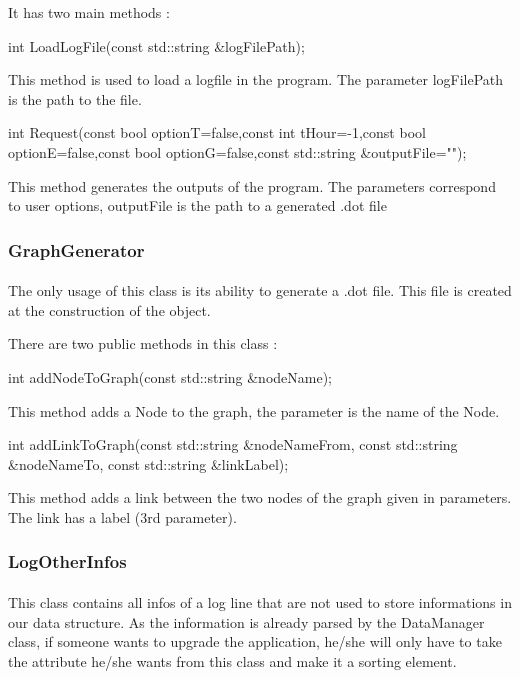 \documentclass[a4paper, 12pts]{article}
\begin{document}
It has two main methods :\newline

int LoadLogFile(const std::string \&logFilePath);

This method is used to load a logfile in the program. The parameter logFilePath is the path to the file.

int Request(const bool optionT=false,const int tHour=-1,const bool optionE=false,const bool optionG=false,const std::string \&outputFile="");

This method generates the outputs of the program. The parameters correspond to user options, outputFile is the path to a generated .dot file
\subsubsection{GraphGenerator}
\paragraph{}
The only usage of this class is its ability to generate a .dot file. This file is created at the construction of the object.

There are two public methods in this class :\newline

int addNodeToGraph(const std::string \&nodeName);

This method adds a Node to the graph, the parameter is the name of the Node.

int addLinkToGraph(const std::string \&nodeNameFrom, const std::string \&nodeNameTo, const std::string \&linkLabel);

This method adds a link between the two nodes of the graph given in parameters. The link has a label (3rd parameter).
\subsubsection{LogOtherInfos}
\paragraph{}
This class contains all infos of a log line that are not used to store informations in our data structure. As the information is already parsed by the DataManager class, if someone wants to upgrade the application, he/she will only have to take the attribute he/she wants from this class and make it a sorting element.


\newpage

%
\end{document}
